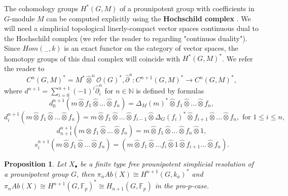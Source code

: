 \documentclass[11pt,a4paper]{article}
\newtheorem{proposition}[theorem]{Proposition}
\begin{document}
The cohomology groups $H^*(G,M)$ of a prounipotent group with coefficients in $G$-module $M$ can be computed  explicitly using the \textbf{Hochschild complex} \cite[3.2]{Mikh2023}.
We will need a simplicial topological linerly-compact vector spaces continuous dual to the Hochschild complex (we refer the reader to \cite[3.4]{Mikh2023} regarding "continuos duality"). 
Since $Hom({}_{-},k)$ is an exact functor on the category of vector spaces, the homotopy groups of this dual complex will coincide with $H^*(G,M)^*$. We refer the reader to\cite[3.4]{Mikh2023}
\begin{equation}\label{hoh8}{
C^n(G,M)^*=M^*\widehat{\otimes}^n \mathcal{O}(G)^*, \widehat{\partial}^n:C^{n+1}(G,M)^*\rightarrow C^{n}(G,M)^*,}
\end{equation}
where $d^{n+1}=\sum^{n+1}_{i=0}(-1)^i\widehat{\partial}_i^n$ for  $n\in \mathbb{N}$ is defined by formulas
$$d_0^{n+1}(m\widehat{\otimes} f_1\widehat{\otimes}\ldots\widehat{\otimes} f_n)=\Delta_M(m)^*\widehat{\otimes} f_1\widehat{\otimes}\ldots\widehat{\otimes} f_n,$$
$$d_i^{n+1}(m\widehat{\otimes} f_1\widehat{\otimes}\ldots\widehat{\otimes} f_n)=m\widehat{\otimes} f_1\widehat{\otimes}\ldots\widehat{\otimes} f_{i-1}\widehat{\otimes}\Delta_G(f_i)^* \widehat{\otimes} f_{i+1}\widehat{\otimes} \ldots\widehat{\otimes} f_n,\mbox{ for $1\leq i \leq n$},$$
$$d_{n+1}^{n+1}(m\widehat{\otimes} f_1\widehat{\otimes}\ldots\widehat{\otimes} f_n)=m\widehat{\otimes} f_1\widehat{\otimes}\ldots\widehat{\otimes} f_n\widehat{\otimes} 1,$$
$$s_i^{n+1}(m\widehat{\otimes} f_1\widehat{\otimes}\ldots\widehat{\otimes} f_n)=(m\widehat{\otimes} f_1 \widehat{\otimes} \ldots f_i \widehat{\otimes} 1 \widehat{\otimes} f_{i+1} \ldots \widehat{\otimes} f_n).$$
\begin{proposition}\label{np1}
 Let $X_{\bullet}$ be a finite type free prounipotent simplicial resolution of a prounipotent group $G$, then $\pi_n Ab(X) \cong H^{n+1}(G,k_a)^*$ and $\pi_n Ab(X) \cong H^{n+1}(G,\mathbb{F}_p)^*\cong  H_{n+1}(G,\mathbb{F}_p)$
in the pro-$p$-case.
\end{proposition}
\end{document}

